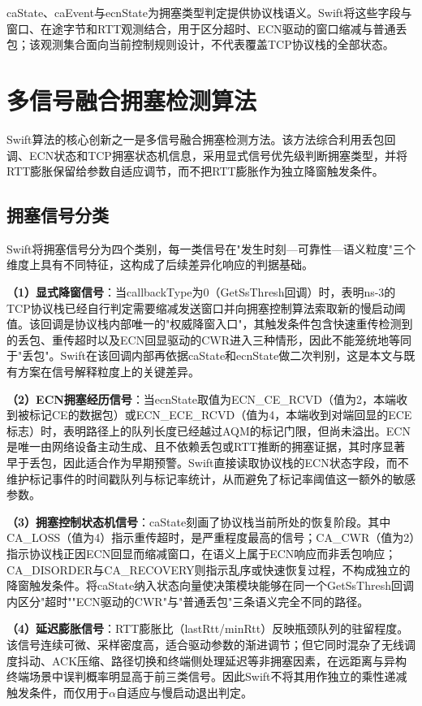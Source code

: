 caState、caEvent与ecnState为拥塞类型判定提供协议栈语义。Swift将这些字段与窗口、在途字节和RTT观测结合，用于区分超时、ECN驱动的窗口缩减与普通丢包；该观测集合面向当前控制规则设计，不代表覆盖TCP协议栈的全部状态。

\section{多信号融合拥塞检测算法}\label{sec:multi-signal}

Swift算法的核心创新之一是多信号融合拥塞检测方法。该方法综合利用丢包回调、ECN状态和TCP拥塞状态机信息，采用显式信号优先级判断拥塞类型，并将RTT膨胀保留给参数自适应调节，而不把RTT膨胀作为独立降窗触发条件。

\subsection{拥塞信号分类}

Swift将拥塞信号分为四个类别，每一类信号在"发生时刻—可靠性—语义粒度"三个维度上具有不同特征，这构成了后续差异化响应的判据基础。

\textbf{（1）显式降窗信号}：当callbackType为0（GetSsThresh回调）时，表明ns-3的TCP协议栈已经自行判定需要缩减发送窗口并向拥塞控制算法索取新的慢启动阈值。该回调是协议栈内部唯一的"权威降窗入口"，其触发条件包含快速重传检测到的丢包、重传超时以及ECN回显驱动的CWR进入三种情形，因此不能笼统地等同于"丢包"。Swift在该回调内部再依据caState和ecnState做二次判别，这是本文与既有方案在信号解释粒度上的关键差异。

\textbf{（2）ECN拥塞经历信号}：当ecnState取值为ECN\_CE\_RCVD（值为2，本端收到被标记CE的数据包）或ECN\_ECE\_RCVD（值为4，本端收到对端回显的ECE标志）时，表明路径上的队列长度已经越过AQM的标记门限，但尚未溢出。ECN是唯一由网络设备主动生成、且不依赖丢包或RTT推断的拥塞证据，其时序显著早于丢包，因此适合作为早期预警。Swift直接读取协议栈的ECN状态字段，而不维护标记事件的时间戳队列与标记率统计，从而避免了标记率阈值这一额外的敏感参数。

\textbf{（3）拥塞控制状态机信号}：caState刻画了协议栈当前所处的恢复阶段。其中CA\_LOSS（值为4）指示重传超时，是严重程度最高的信号；CA\_CWR（值为2）指示协议栈正因ECN回显而缩减窗口，在语义上属于ECN响应而非丢包响应；CA\_DISORDER与CA\_RECOVERY则指示乱序或快速恢复过程，不构成独立的降窗触发条件。将caState纳入状态向量使决策模块能够在同一个GetSsThresh回调内区分"超时""ECN驱动的CWR"与"普通丢包"三条语义完全不同的路径。

\textbf{（4）延迟膨胀信号}：RTT膨胀比（lastRtt/minRtt）反映瓶颈队列的驻留程度。该信号连续可微、采样密度高，适合驱动参数的渐进调节；但它同时混杂了无线调度抖动、ACK压缩、路径切换和终端侧处理延迟等非拥塞因素，在远距离与异构终端场景中误判概率明显高于前三类信号。因此Swift不将其用作独立的乘性递减触发条件，而仅用于$\alpha$自适应与慢启动退出判定。

